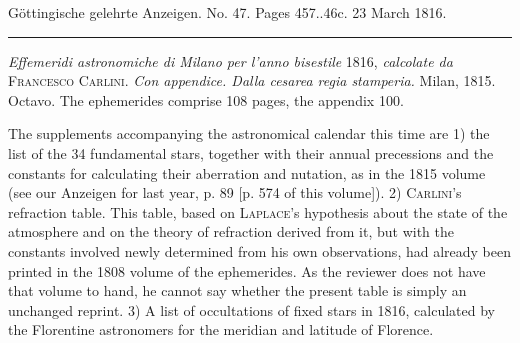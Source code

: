 \clearpage
{}

\begin{center}\small Göttingische gelehrte Anzeigen. No. 47. Pages 457..46c. 23 March 1816.\\[3pt]\rule{.72\linewidth}{.3pt}\end{center}

\emph{Effemeridi astronomiche di Milano per l’anno bisestile} 1816, \emph{calcolate da} \textsc{Francesco Carlini}. \emph{Con appendice. Dalla cesarea regia stamperia.} Milan, 1815. Octavo. The ephemerides comprise 108 pages, the appendix 100.

The supplements accompanying the astronomical calendar this time are 1) the list of the 34 fundamental stars, together with their annual precessions and the constants for calculating their aberration and nutation, as in the 1815 volume (see our Anzeigen for last year, p. 89 [p. 574 of this volume]). 2) \textsc{Carlini}’s refraction table. This table, based on \textsc{Laplace}’s hypothesis about the state of the atmosphere and on the theory of refraction derived from it, but with the constants involved newly determined from his own observations, had already been printed in the 1808 volume of the ephemerides. As the reviewer does not have that volume to hand, he cannot say whether the present table is simply an unchanged reprint. 3) A list of occultations of fixed stars in 1816, calculated by the Florentine astronomers for the meridian and latitude of Florence.

